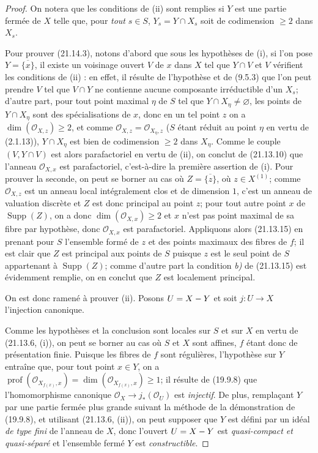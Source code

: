 \begin{proof}
On notera que les conditions de (ii) sont remplies si $Y$ est une partie fermée de $X$
telle que, pour \emph{tout} $s\in S$, $Y_s=Y\cap X_s$ soit de codimension $\geq2$ dans
$X_s$.

Pour prouver (21.14.3), notons d'abord que sous les hypothèses de (i), si l'on
pose $Y=\overline{\{x\}}$, il existe un voisinage ouvert $V$ de $x$ dans $X$ tel que
$Y\cap V$ et $V$ vérifient les conditions de (ii) : en effet, il résulte de l'hypothèse
et de (9.5.3) que l'on peut prendre $V$ tel que $V\cap Y$ ne contienne aucune
composante irréductible d'un $X_s$; d'autre part, pour tout point maximal $\eta$ de
$S$ tel que $Y\cap X_\eta\neq\varnothing$, les points de $Y\cap X_\eta$ sont des
spécialisations de $x$, donc en un tel point $z$ on a
$\dim(\mathcal O_{X,z})\geq2$, et comme
$\mathcal O_{X,z}=\mathcal O_{X_\eta,z}$ ($S$ étant réduit au point $\eta$ en vertu
de (2.1.13)), $Y\cap X_\eta$ est bien de codimension $\geq2$ dans $X_\eta$. Comme le
couple $(V,Y\cap V)$ est alors parafactoriel en vertu de (ii), on conclut de (21.13.10)
que l'anneau $\mathcal O_{X,x}$ est parafactoriel, c'est-à-dire la première assertion
de (i). Pour prouver la seconde, on peut se borner au cas où
$Z=\overline{\{z\}}$, où $z\in X^{(1)}$; comme $\mathcal O_{X,z}$ est un anneau local
intégralement clos et de dimension $1$, c'est un anneau de valuation discrète et $Z$
est donc principal au point $z$; pour tout autre point $x$ de
$\operatorname{Supp}(Z)$, on a donc $\dim(\mathcal O_{X,x})\geq2$ et $x$ n'est pas
point maximal de sa fibre par hypothèse, donc $\mathcal O_{X,x}$ est parafactoriel.
Appliquons alors (21.13.15) en prenant pour $S$ l'ensemble formé de $z$ et des points
maximaux des fibres de $f$; il est clair que $Z$ est principal aux points de $S$
puisque $z$ est le seul point de $S$ appartenant à $\operatorname{Supp}(Z)$; comme
d'autre part la condition \emph{b)} de (21.13.15) est évidemment remplie, on en conclut que
$Z$ est localement principal.

On est donc ramené à prouver (ii). Posons $U=X- Y$ et soit $j:U\to X$ l'injection
canonique.

Comme les hypothèses et la conclusion sont locales sur $S$ et sur $X$ en vertu de
(21.13.6, (i)), on peut se borner au cas où $S$ et $X$ sont affines, $f$ étant donc de
présentation finie. Puisque les fibres de $f$ sont régulières, l'hypothèse sur $Y$
entraîne que, pour tout point $x\in Y$, on a $\operatorname{prof}(\mathcal O_{X_{f(x)},x})=\dim(\mathcal O_{X_{f(x)},x})\geq1$;
il résulte de (19.9.8) que l'homomorphisme canonique
$\mathcal O_X\to j_*(\mathcal O_U)$ est \emph{injectif}. De plus, remplaçant $Y$ par
une partie fermée plus grande suivant la méthode de la démonstration de (19.9.8), et
utilisant (21.13.6, (ii)), on peut supposer que $Y$ est défini par un idéal \emph{de
type fini} de l'anneau de $X$, donc l'ouvert $U=X- Y$ est \emph{quasi-compact et
quasi-séparé} et l'ensemble fermé $Y$ est \emph{constructible}.


\end{proof}
